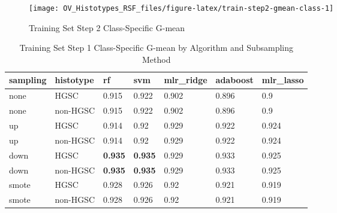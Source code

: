 \documentclass[
]{report}
\begin{document}
\begin{figure}[H]

{\centering \texttt{[image: OV\_Histotypes\_RSF\_files/figure-latex/train-step2-gmean-class-1]} 

}

\caption{Training Set Step 2 Class-Specific G-mean}\label{fig:train-step2-gmean-class}
\end{figure}

\begin{table}

\caption{\label{tab:train-step1-gmean-class-table}Training Set Step 1 Class-Specific G-mean by Algorithm and Subsampling Method}
\centering
\begin{tabular}[t]{l|l|l|l|l|l|l}
\hline
sampling & histotype & rf & svm & mlr\_ridge & adaboost & mlr\_lasso\\
\hline
none & HGSC & 0.915 & 0.922 & 0.902 & 0.896 & 0.9\\
\hline
none & non-HGSC & 0.915 & 0.922 & 0.902 & 0.896 & 0.9\\
\hline
up & HGSC & 0.914 & 0.92 & 0.929 & 0.922 & 0.924\\
\hline
up & non-HGSC & 0.914 & 0.92 & 0.929 & 0.922 & 0.924\\
\hline
down & HGSC & \textbf{0.935} & \textbf{0.935} & 0.929 & 0.933 & 0.925\\
\hline
down & non-HGSC & \textbf{0.935} & \textbf{0.935} & 0.929 & 0.933 & 0.925\\
\hline
smote & HGSC & 0.928 & 0.926 & 0.92 & 0.921 & 0.919\\
\hline
smote & non-HGSC & 0.928 & 0.926 & 0.92 & 0.921 & 0.919\\
\hline
\end{tabular}
\end{table}
\end{document}
